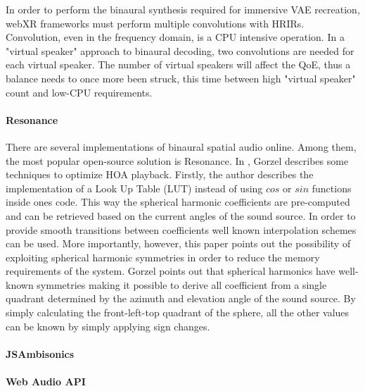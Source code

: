 In order to perform the binaural synthesis required for immersive VAE recreation, webXR frameworks must perform multiple convolutions with HRIRs. Convolution, even in the frequency domain, is a CPU intensive operation. In a "virtual speaker" approach to binaural decoding, two convolutions are needed for each virtual speaker. The number of virtual speakers will affect the QoE, thus a balance needs to once more been struck, this time between high "virtual speaker" count and low-CPU requirements. 

\paragraph{Resonance}

There are several implementations of binaural spatial audio online. Among them, the most popular open-source solution is Resonance. In \cite{gorzel2019efficient}, Gorzel describes some techniques to optimize HOA playback. Firstly, the author describes the implementation of a Look Up Table (LUT) instead of using $cos$ or $sin$ functions inside ones code. This way the spherical harmonic coefficients are pre-computed and can be retrieved based on the current angles of the sound source. In order to provide smooth transitions between coefficients well known interpolation schemes can be used. More importantly, however, this paper points out the possibility of exploiting spherical harmonic symmetries in order to reduce the memory requirements of the system. Gorzel points out that spherical harmonics have well-known symmetries making it possible to derive all coefficient from a single quadrant determined by the azimuth and elevation angle of the sound source. By simply calculating the front-left-top quadrant of the sphere, all the other values can be known by simply applying sign changes. 

\paragraph{JSAmbisonics}

\paragraph{Web Audio API}





